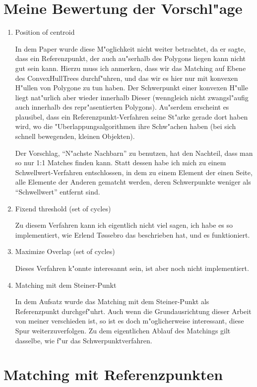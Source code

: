 \documentclass[a4paper,10pt,twoside]{scrreprt}
\begin{document}
\section{Meine Bewertung der Vorschl"age}
\begin{enumerate}
\item Position of centroid

In dem Paper wurde diese M"oglichkeit nicht weiter betrachtet, da er sagte, dass ein Referenzpunkt, der auch au"serhalb des Polygons liegen kann nicht gut sein kann. Hierzu muss ich anmerken, dass wir das Matching auf Ebene des ConvexHullTrees durchf"uhren, und das wir es hier nur mit konvexen H"ullen von Polygone zu tun haben. Der Schwerpunkt einer konvexen H"ulle liegt nat"urlich aber wieder innerhalb Dieser (wenngleich nicht zwangsl"aufig auch innerhalb des repr"asentierten Polygons). Au"serdem erscheint es plausibel, dass ein Referenzpunkt-Verfahren seine St"arke gerade dort haben wird, wo die "Uberlappungsalgorithmen ihre Schw"achen haben (bei sich schnell bewegenden, kleinen Objekten).

Der Vorschlag, "`N"achste Nachbarn"' zu benutzen, hat den Nachteil, dass man so nur 1:1 Matches finden kann. Statt dessen habe ich mich zu einem Schwellwert-Verfahren entschlossen, in dem zu einem Element der einen Seite, alle Elemente der Anderen gematcht werden, deren Schwerpunkte weniger als "`Schwellwert"' entfernt sind. 

\item Fixend threshold (set of cycles)

Zu diesem Verfahren kann ich eigentlich nicht viel sagen, ich habe es so implementiert, wie Erlend T\o{}ssebro das beschrieben hat, und es funktioniert.

\item Maximize Overlap (set of cycles)

Dieses Verfahren k"onnte interesannt sein, ist aber noch nicht implementiert.

\item Matching mit dem Steiner-Punkt

In dem Aufsatz \cite{AAR} wurde das Matching mit dem Steiner-Punkt als Referenzpunkt durchgef"uhrt. Auch wenn die Grundausrichtung dieser Arbeit von meiner verschieden ist, so ist es doch m"oglicherweise interessant, diese Spur weiterzuverfolgen. Zu dem eigentlichen Ablauf des Matchings gilt dasselbe, wie f"ur das Schwerpunktverfahren.
\end{enumerate}

\section{Matching mit Referenzpunkten}
\end{document}
